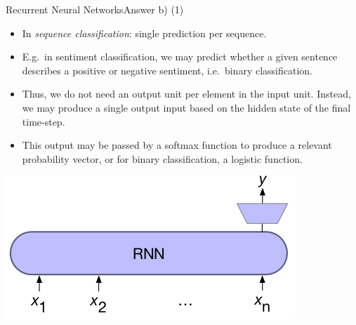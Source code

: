 \documentclass[t]{beamer}
\begin{document}
\begin{frame}{Recurrent Neural Networks}{Answer b) (1)}
    \begin{itemize}
        \item In \emph{sequence classification}: single prediction per sequence.
        \item E.g.\ in sentiment classification, we may predict
              whether a given sentence describes a positive or negative
              sentiment, i.e.\ binary classification.
        \item Thus, we do not need an output unit per element in the input unit.
              Instead, we may produce a single output input based on the hidden
              state of the final time-step.
        \item This output may be passed by a softmax function to produce a
              relevant probability vector, or for binary classification, a
              logistic function.
    \end{itemize}
    \begin{center}
        \includegraphics[scale=0.4]{img/sequence_classification_1.png}
    \end{center}
\end{frame}
\end{document}
